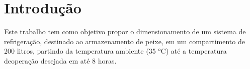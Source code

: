 
\chapter{Introdução}

Este trabalho tem como objetivo propor o dimensionamento de um sistema de refrigeração, destinado ao armazenamento de peixe, em um compartimento de 200 litros, partindo da temperatura ambiente (35 °C) até a temperatura deoperação desejada em até 8 horas.